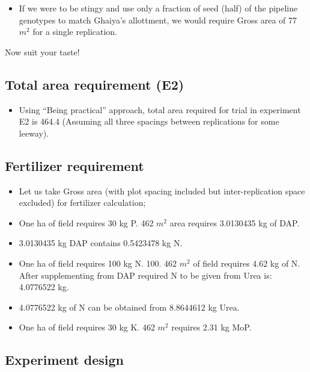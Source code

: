 \documentclass[12pt,]{article}
\providecommand{\tightlist}{%
  \setlength{\itemsep}{0pt}\setlength{\parskip}{0pt}}
\begin{document}
\begin{itemize}
\tightlist
\item
  If we were to be stingy and use only a fraction of seed (half) of the pipeline genotypes to match Ghaiya's allottment, we would require Gross area of 77 \(m^2\) for a single replication.
\end{itemize}

Now suit your taste!

\hypertarget{total-area-requirement-e2}{%
\subsection{Total area requirement (E2)}\label{total-area-requirement-e2}}

\begin{itemize}
\tightlist
\item
  Using ``Being practical'' approach, total area required for trial in experiment E2 is 464.4 (Assuming all three spacings between replications for some leeway).
\end{itemize}

\hypertarget{fertilizer-requirement}{%
\subsection{Fertilizer requirement}\label{fertilizer-requirement}}

\begin{itemize}
\tightlist
\item
  Let us take Gross area (with plot spacing included but inter-replication space excluded) for fertilizer calculation;
\item
  One ha of field requires 30 kg P. 462 \(m^2\) area requires 3.0130435 kg of DAP.
\item
  3.0130435 kg DAP contains 0.5423478 kg N.
\item
  One ha of field requires 100 kg N. 100. 462 \(m^2\) of field requires 4.62 kg of N. After supplementing from DAP required N to be given from Urea is: 4.0776522 kg.
\item
  4.0776522 kg of N can be obtained from 8.8644612 kg Urea.
\item
  One ha of field requires 30 kg K. 462 \(m^2\) requires 2.31 kg MoP.
\end{itemize}

\hypertarget{experiment-design}{%
\subsection{Experiment design}\label{experiment-design}}
\end{document}
